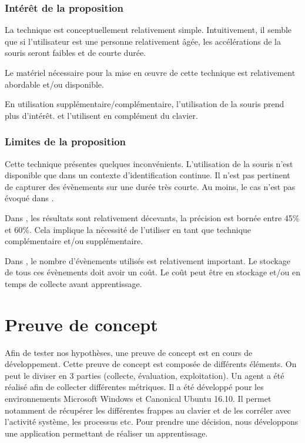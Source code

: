 \documentclass[conference,compsoc]{IEEEtran}
\begin{document}
\subsubsection{Intérêt de la proposition}
La technique est conceptuellement relativement simple. Intuitivement, il semble que si l'utilisateur est une personne relativement âgée, les accélérations de la souris seront faibles et de courte durée.

Le matériel nécessaire pour la mise en \oe{}uvre de cette technique est relativement abordable et/ou disponible.

En utilisation supplémentaire/complémentaire, l'utilisation de la souris prend plus d'intérêt. \cite{fridman2015multi} et \cite{7477228} l'utilisent en complément du clavier.

\subsubsection{Limites de la proposition}
Cette technique présentes quelques inconvénients. L'utilisation de la souris n'est disponible que dans un contexte d'identification continue. Il n'est pas pertinent de capturer des évènements sur une durée très courte. Au moins, le cas n'est pas évoqué dans \cite{7477228}.

Dans \cite{7477228}, les résultats sont relativement décevants, la précision est bornée entre 45\% et 60\%. Cela implique la nécessité de l'utiliser en tant que technique complémentaire et/ou supplémentaire.

Dans \cite{fridman2015multi}, le nombre d'évènements utilisés est relativement important. Le stockage de tous ces évènements doit avoir un coût. Le coût peut être en stockage et/ou en temps de collecte avant apprentissage.

\section{Preuve de concept}
Afin de tester nos hypothèses, une preuve de concept est en cours de développement.
 Cette preuve de concept est composée de différents éléments. On peut le diviser en 3 parties (collecte, évaluation, exploitation). Un agent a été réalisé afin de collecter différentes métriques.
 Il a été développé pour les environnements Microsoft Windows et Canonical Ubuntu 16.10.
 Il permet notamment de récupérer les différentes frappes au clavier et de les corréler avec l'activité système, les processus etc.
 Pour prendre une décision, nous développons une application permettant de réaliser un apprentissage.
\end{document}
